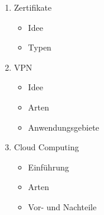 \documentclass[a4paper]{report}
\begin{document}
\begin{enumerate}
\begin{itemize}
\end{itemize}
\item Zertifikate
\begin{itemize}
\item Idee
\item Typen
\end{itemize}
\item VPN
\begin{itemize}
\item Idee
\item Arten
\item Anwendungsgebiete
\end{itemize}
\item Cloud Computing
\begin{itemize}
\item Einführung
\item Arten
\item Vor- und Nachteile
\end{itemize}
\end{enumerate}
\end{document}
